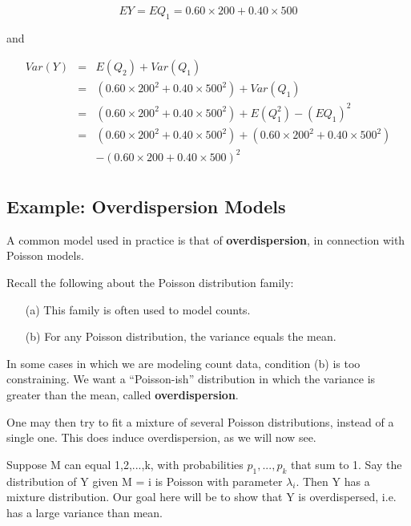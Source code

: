 \documentclass[11pt]{article}
\begin{document}
\begin{equation}
EY = EQ_1 = 0.60 \times 200 + 0.40 \times 500
\end{equation}

and 

\begin{eqnarray}
Var(Y) &=& E(Q_2) + Var(Q_1) \\
&=& (0.60 \times 200^2 + 0.40 \times 500^2) + Var(Q_1) \\
&=& (0.60 \times 200^2 + 0.40 \times 500^2) + E(Q_1^2) - (EQ_1)^2 \\
&=& (0.60 \times 200^2 + 0.40 \times 500^2) + (0.60 \times 200^2 + 0.40
\times 500^2)  \\
& & - (0.60 \times 200 + 0.40 \times 500)^2 \\
\end{eqnarray}

\subsection{Example:  Overdispersion Models}

A common model used in practice is that of {\bf overdispersion}, in
connection with Poisson models.  

Recall the following about the Poisson distribution family:

\begin{itemize}

\item [(a)] This family is often used to model counts.

\item [(b)] For any Poisson distribution, the variance equals the mean.

\end{itemize}

In some cases in which we are modeling count data, condition (b) is too
constraining.  We want a ``Poisson-ish''
distribution in which the variance is greater
than the mean, called {\bf overdispersion}.  

One may then try to fit a mixture of several Poisson distributions,
instead of a single one.  This does induce overdispersion, as we will
now see.  

Suppose M can equal 1,2,...,k, with probabilities $p_1,...,p_k$ that sum
to 1.  Say the distribution of Y given M = i is Poisson with parameter
$\lambda_i$.  Then Y has a mixture distribution.  Our goal here will be
to show that Y is overdispersed, i.e. has a large variance than mean.
\end{document}
